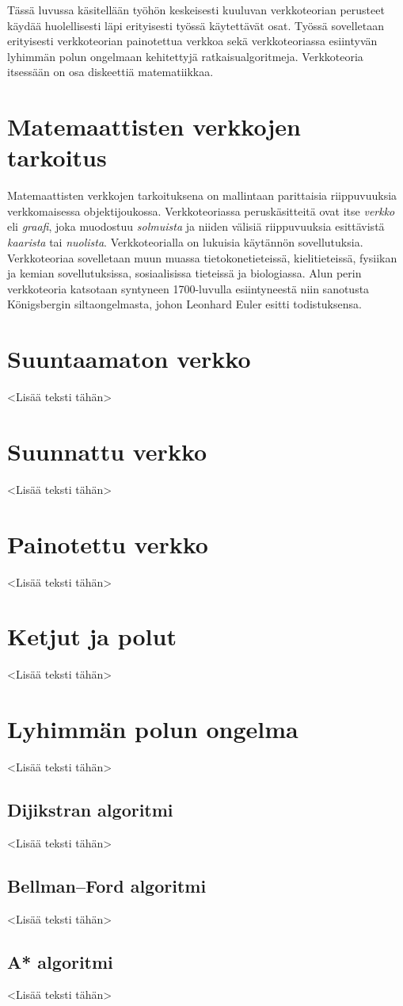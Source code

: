 Tässä luvussa käsitellään työhön keskeisesti kuuluvan verkkoteorian perusteet käydää huolellisesti läpi erityisesti työssä käytettävät osat.
Työssä sovelletaan erityisesti verkkoteorian painotettua verkkoa sekä verkkoteoriassa esiintyvän lyhimmän polun ongelmaan kehitettyjä ratkaisualgoritmeja.
Verkkoteoria itsessään on osa diskeettiä matematiikkaa.

\section{Matemaattisten verkkojen tarkoitus}

Matemaattisten verkkojen tarkoituksena on mallintaan parittaisia riippuvuuksia verkkomaisessa objektijoukossa.
Verkkoteoriassa peruskäsitteitä ovat itse \textit{verkko} eli \textit{graafi}, joka muodostuu \textit{solmuista} ja niiden välisiä riippuvuuksia esittävistä \textit{kaarista} tai \textit{nuolista}.
Verkkoteorialla on lukuisia käytännön sovellutuksia. Verkkoteoriaa sovelletaan muun muassa tietokonetieteissä, kielitieteissä, fysiikan ja kemian sovellutuksissa, sosiaalisissa tieteissä ja biologiassa.
Alun perin verkkoteoria katsotaan syntyneen 1700-luvulla esiintyneestä niin sanotusta Königsbergin siltaongelmasta, johon Leonhard Euler esitti todistuksensa.

\section{Suuntaamaton verkko}

<Lisää teksti tähän>

\section{Suunnattu verkko}

<Lisää teksti tähän>

\section{Painotettu verkko}

<Lisää teksti tähän>

\section{Ketjut ja polut}

<Lisää teksti tähän>

\section{Lyhimmän polun ongelma}

<Lisää teksti tähän>

  \subsection{Dijikstran algoritmi}

  <Lisää teksti tähän>

  \subsection{Bellman–Ford algoritmi}

  <Lisää teksti tähän>

  \subsection{A* algoritmi}

  <Lisää teksti tähän>
